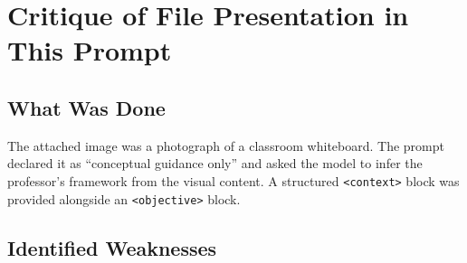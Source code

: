 \documentclass[12pt,a4paper]{article}
\begin{document}
\section{Critique of File Presentation in This Prompt}

\subsection{What Was Done}

The attached image was a photograph of a classroom whiteboard. The prompt
declared it as ``conceptual guidance only'' and asked the model to infer the
professor's framework from the visual content. A structured \texttt{<context>}
block was provided alongside an \texttt{<objective>} block.

\subsection{Identified Weaknesses}
\end{document}
